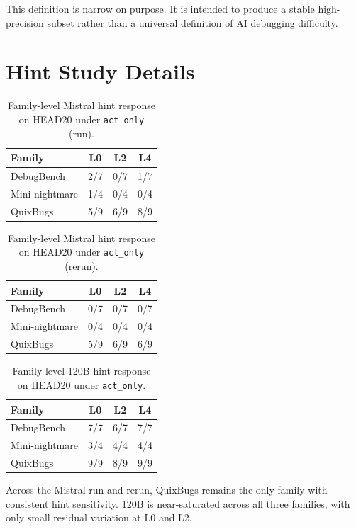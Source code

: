 \documentclass{article}
\begin{document}
This definition is narrow on purpose. It is intended to produce a stable high-precision subset rather than a universal definition of AI debugging difficulty.

\section{Hint Study Details}

\begin{table}[H]
\centering
\caption{Family-level Mistral hint response on HEAD20 under \texttt{act\_only} (run).}
\label{tab:mistralhintfamilyrun}
\begin{tabular}{lccc}
\toprule
Family & L0 & L2 & L4 \\
\midrule
DebugBench & 2/7 & 0/7 & 1/7 \\
Mini-nightmare & 1/4 & 0/4 & 0/4 \\
QuixBugs & 5/9 & 6/9 & 8/9 \\
\bottomrule
\end{tabular}
\end{table}

\begin{table}[H]
\centering
\caption{Family-level Mistral hint response on HEAD20 under \texttt{act\_only} (rerun).}
\label{tab:mistralhintfamilyrerun}
\begin{tabular}{lccc}
\toprule
Family & L0 & L2 & L4 \\
\midrule
DebugBench & 0/7 & 0/7 & 0/7 \\
Mini-nightmare & 0/4 & 0/4 & 0/4 \\
QuixBugs & 5/9 & 6/9 & 6/9 \\
\bottomrule
\end{tabular}
\end{table}

\begin{table}[H]
\centering
\caption{Family-level 120B hint response on HEAD20 under \texttt{act\_only}.}
\label{tab:120bhintfamilyr2}
\begin{tabular}{lccc}
\toprule
Family & L0 & L2 & L4 \\
\midrule
DebugBench & 7/7 & 6/7 & 7/7 \\
Mini-nightmare & 3/4 & 4/4 & 4/4 \\
QuixBugs & 9/9 & 8/9 & 9/9 \\
\bottomrule
\end{tabular}
\end{table}

Across the Mistral run and rerun, QuixBugs remains the only family with consistent hint sensitivity. 120B is near-saturated across all three families, with only small residual variation at L0 and L2.
\end{document}
